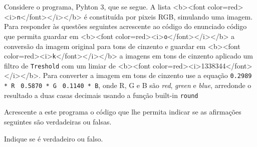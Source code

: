 \documentclass[12pt,varwidth=16cm,border=1pt]{standalone}
\begin{document}
Considere o programa, Pyhton 3, que se segue. A lista <b><font color=red><i>\verb+n+</font></i></b> é constituída por pixeis RGB, simulando uma imagem. Para responder às questões seguintes acrescente ao código do enunciado código que permita guardar em <b><font color=red><i>\verb+o+</font></i></b> a conversão da imagem original para tons de cinzento e guardar em <b><font color=red><i>\verb+k+</font></i></b> a imagens em tons de cinzento aplicado um filtro de \verb+Treshold+ com um limiar de <b><font color=red><i>1338344</font></i></b>. Para converter a imagem em tons de cinzento use a equação \verb+0.2989 * R + \verb+0.5870 * G + \verb+0.1140 * B+, onde R, G e B são \textit{red}, \textit{green} e \textit{blue}, arredonde o resultado a duas casas decimais usando a função built-in \verb+round+



Acrescente a este programa o código que lhe permita indicar se as
afirmações seguintes são verdadeiras ou falsas.

Indique se é verdadeiro ou falso.
\end{document}
